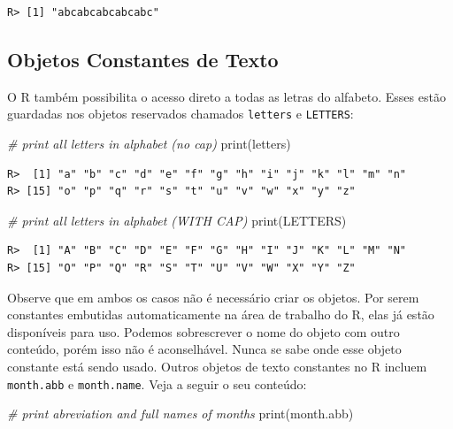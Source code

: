 \documentclass[
  11pt,
]{book}
\newenvironment{Shaded}{\begin{snugshade}}{\end{snugshade}}
\newcommand{\CommentTok}[1]{\textcolor[rgb]{0.37,0.37,0.37}{\textit{#1}}}
\newcommand{\FunctionTok}[1]{\textcolor[rgb]{0,0,0}{#1}}
\newcommand{\NormalTok}[1]{#1}
\begin{document}
\begin{verbatim}
R> [1] "abcabcabcabcabc"
\end{verbatim}

\hypertarget{objetos-constantes-de-texto}{%
\subsection{Objetos Constantes de Texto}\label{objetos-constantes-de-texto}}

O R também possibilita o acesso direto a todas as letras do alfabeto. Esses estão guardadas nos objetos reservados chamados \texttt{letters} e \texttt{LETTERS}:  

\begin{Shaded}
\begin{Highlighting}[]
\CommentTok{\# print all letters in alphabet (no cap)}
\FunctionTok{print}\NormalTok{(letters)}
\end{Highlighting}
\end{Shaded}

\begin{verbatim}
R>  [1] "a" "b" "c" "d" "e" "f" "g" "h" "i" "j" "k" "l" "m" "n"
R> [15] "o" "p" "q" "r" "s" "t" "u" "v" "w" "x" "y" "z"
\end{verbatim}

\begin{Shaded}
\begin{Highlighting}[]
\CommentTok{\# print all letters in alphabet (WITH CAP)}
\FunctionTok{print}\NormalTok{(LETTERS)}
\end{Highlighting}
\end{Shaded}

\begin{verbatim}
R>  [1] "A" "B" "C" "D" "E" "F" "G" "H" "I" "J" "K" "L" "M" "N"
R> [15] "O" "P" "Q" "R" "S" "T" "U" "V" "W" "X" "Y" "Z"
\end{verbatim}

Observe que em ambos os casos não é necessário criar os objetos. Por serem constantes embutidas automaticamente na área de trabalho do R, elas já estão disponíveis para uso. Podemos sobrescrever o nome do objeto com outro conteúdo, porém isso não é aconselhável. Nunca se sabe onde esse objeto constante está sendo usado. Outros objetos de texto constantes no R incluem \texttt{month.abb} e \texttt{month.name}. Veja a seguir o seu conteúdo:  

\begin{Shaded}
\begin{Highlighting}[]
\CommentTok{\# print abreviation and full names of months}
\FunctionTok{print}\NormalTok{(month.abb)}
\end{Highlighting}
\end{Shaded}
\end{document}
